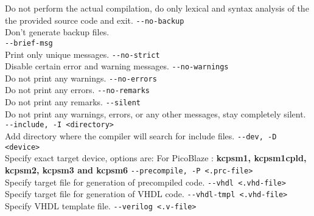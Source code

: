             Do not perform the actual compilation, do only lexical and syntax analysis of the the provided source code and exit.
            {
                \usecodefont
                \verb'--no-backup'\\
            }
            Don't generate backup files.\\
            {
                \usecodefont
                \verb'--brief-msg'\\
            }
            Print only unique messages.
            {
                \usecodefont
                \verb'--no-strict'\\
            }
            Disable certain error and warning messages.
            {
                \usecodefont
                \verb'--no-warnings'\\
            }
            Do not print any warnings.
            {
                \usecodefont
                \verb'--no-errors'\\
            }
            Do not print any errors.
            {
                \usecodefont
                \verb'--no-remarks'\\
            }
            Do not print any remarks.
            {
                \usecodefont
                \verb'--silent'\\
            }
            Do not print any warnings, errors, or any other messages, stay completely silent.
            {
                \usecodefont
                \verb'--include, -I <directory>'\\
            }
            Add directory where the compiler will search for include files.
            {
                \usecodefont
                \verb'--dev, -D <device>'\\
            }
            Specify exact target device, options are:
            For PicoBlaze : \textbf{kcpsm1, kcpsm1cpld, kcpsm2, kcpsm3 and kcpsm6}
            {
                \usecodefont
                \verb'--precompile, -P <.prc-file>'\\
            }
            Specify target file for generation of precompiled code.
            {
                \usecodefont
                \verb'--vhdl <.vhd-file>'\\
            }
            Specify target file for generation of VHDL code.
            {
                \usecodefont
                \verb'--vhdl-tmpl <.vhd-file>'\\
            }
            Specify VHDL template file.
            {
                \usecodefont
                \verb'--verilog <.v-file>'\\
            }
